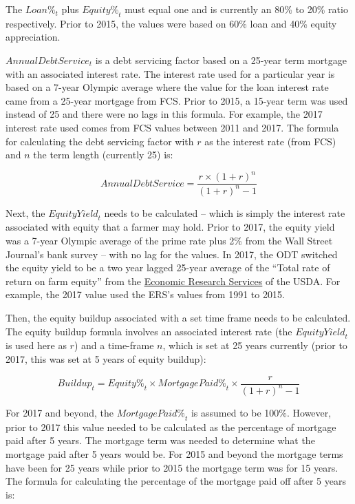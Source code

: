 \documentclass[]{article}
\begin{document}
The \({Loan \%}_t\) plus \({Equity \%}_t\) must equal one and is
currently an 80\% to 20\% ratio respectively. Prior to 2015, the values
were based on 60\% loan and 40\% equity appreciation.

\({Annual Debt Service}_t\) is a debt servicing factor based on a
25-year term mortgage with an associated interest rate. The interest
rate used for a particular year is based on a 7-year Olympic average
where the value for the loan interest rate came from a 25-year mortgage
from FCS. Prior to 2015, a 15-year term was used instead of 25 and there
were no lags in this formula. For example, the 2017 interest rate used
comes from FCS values between 2011 and 2017. The formula for calculating
the debt servicing factor with \(r\) as the interest rate (from FCS) and
\(n\) the term length (currently 25) is:

\[ {Annual Debt Service} = \frac{r \times (1 + r)^n}{(1 + r)^n - 1} \]

Next, the \({Equity Yield}_t\) needs to be calculated -- which is simply
the interest rate associated with equity that a farmer may hold. Prior
to 2017, the equity yield was a 7-year Olympic average of the prime rate
plus 2\% from the Wall Street Journal's bank survey -- with no lag for
the values. In 2017, the ODT switched the equity yield to be a two year
lagged 25-year average of the ``Total rate of return on farm equity''
from the \href{https://data.ers.usda.gov/reports.aspx?ID=17838}{Economic
Research Services} of the USDA. For example, the 2017 value used the
ERS's values from 1991 to 2015.

Then, the equity buildup associated with a set time frame needs to be
calculated. The equity buildup formula involves an associated interest
rate (the \({Equity Yield}_t\) is used here as \(r\)) and a time-frame
\(n\), which is set at 25 years currently (prior to 2017, this was set
at 5 years of equity buildup):

\[ {Buildup}_t = {Equity \%}_t \times {Mortgage Paid \%}_t \times \frac{r}{(1 + r)^n - 1} \]

For 2017 and beyond, the \({Mortgage Paid \%}_t\) is assumed to be
100\%. However, prior to 2017 this value needed to be calculated as the
percentage of mortgage paid after 5 years. The mortgage term was needed
to determine what the mortgage paid after 5 years would be. For 2015 and
beyond the mortgage terms have been for 25 years while prior to 2015 the
mortgage term was for 15 years. The formula for calculating the
percentage of the mortgage paid off after 5 years is:
\end{document}
